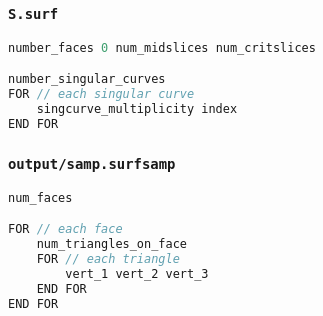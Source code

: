\subsubsection{\tt S.surf}
\label{sec:s.surf}

\begin{center}\begin{minipage}{0.9\linewidth}
\begin{lstlisting}[language=c++, caption={\tt output/S.surf}, captionpos=b]
number_faces 0 num_midslices num_critslices

number_singular_curves
FOR // each singular curve
	singcurve_multiplicity index
END FOR
\end{lstlisting}
\end{minipage}\end{center}



\subsubsection{\tt output/samp.surfsamp}
\label{sec:samp.surfsamp}



\begin{center}\begin{minipage}{0.9\linewidth}
\begin{lstlisting}[language=c++, caption={\tt output/samp.surfsamp}, captionpos=b]
num_faces

FOR // each face
	num_triangles_on_face
	FOR // each triangle
		vert_1 vert_2 vert_3
	END FOR
END FOR
\end{lstlisting}
\end{minipage}\end{center}


